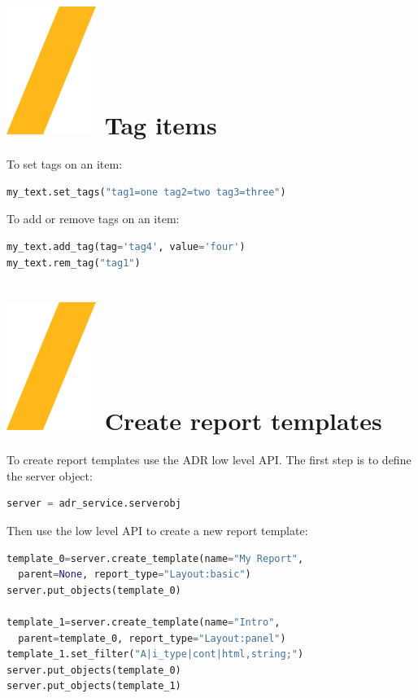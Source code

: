 \documentclass[9pt,landscape]{article}
\begin{document}
\begin{multicols}{3}
\section{\includegraphics[height=\fontcharht\font`\S]{slash.png}  Tag items}
To set tags on an item:

\begin{lstlisting}[language=Python]
my_text.set_tags("tag1=one tag2=two tag3=three")
\end{lstlisting} 

To add or remove tags on an item:
\begin{lstlisting}[language=Python]
my_text.add_tag(tag='tag4', value='four')
my_text.rem_tag("tag1")
\end{lstlisting} 

\section{\includegraphics[height=\fontcharht\font`\S]{slash.png} Create report templates}
To create report templates use the ADR low level API. The first step is to define 
the server object:
\begin{lstlisting}[language=Python]
server = adr_service.serverobj
\end{lstlisting}
Then use the low level API to create a new report template:
\begin{lstlisting}[language=Python]
template_0=server.create_template(name="My Report", 
  parent=None, report_type="Layout:basic")
server.put_objects(template_0)

template_1=server.create_template(name="Intro", 
  parent=template_0, report_type="Layout:panel")
template_1.set_filter("A|i_type|cont|html,string;")
server.put_objects(template_0)
server.put_objects(template_1)


\end{lstlisting}
\end{multicols}
\end{document}

